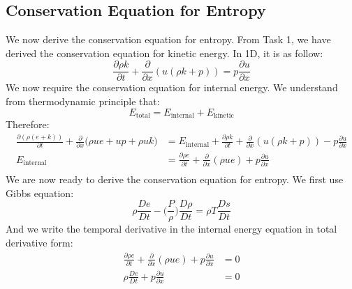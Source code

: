 \documentclass[a4paper]{article}
\numberwithin{equation}{section}
\begin{document}
\subsection{Conservation Equation for Entropy}
We now derive the conservation equation for entropy. From Task 1, we have derived the conservation equation for kinetic energy. In 1D, it is as follow:
\begin{equation}
    \frac{\partial \rho k}{\partial t} + \frac{\partial}{\partial x}(u(\rho k + p)) = p \frac{\partial u}{\partial x}
\end{equation}
We now require the conservation equation for internal energy. We understand from thermodynamic principle that:
\begin{equation}
    E_{\text{total}} = E_{\text{internal}} + E_{\text{kinetic}}
\end{equation}
Therefore:
\begin{equation}
    \begin{split}
        \frac{\partial (\rho(e + k))}{\partial t} + \frac{\partial}{\partial x} \big(\rho u e + up + \rho u k\big) &=  E_{\text{internal}} +     \frac{\partial \rho k}{\partial t} + \frac{\partial}{\partial x}(u(\rho k + p)) - p \frac{\partial u}{\partial x}\\
        E_{\text{internal}} &= \frac{\partial \rho e}{\partial t} + \frac{\partial}{\partial x}(\rho u e) + p \frac{\partial u}{\partial x}\\
    \end{split}
\end{equation}
We are now ready to derive the conservation equation for entropy. We first use Gibbs equation:
\begin{equation}\label{eq:GibbsEquation}
    \rho \frac{D e}{Dt} - \big(\frac
    {P}{\rho}\big) \frac{D \rho}{D t} = \rho T \frac{D s}{D t}
\end{equation}
And we write the temporal derivative in the internal energy equation in total derivative form:
\begin{equation} \label{eq:internalEnergy}
    \begin{split}
        \frac{\partial \rho e}{\partial t} + \frac{\partial}{\partial x}(\rho u e) + p \frac{\partial u}{\partial x} &= 0\\
        \rho \frac{D e}{D t} + p \frac{\partial u}{\partial x} &= 0\\
    \end{split}
\end{equation}
\end{document}
